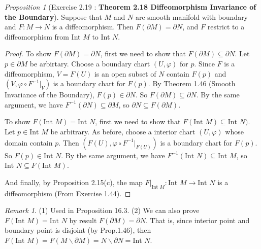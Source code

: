 \documentclass[a4paper]{article}
\theoremstyle{remark}
\newtheorem*{remark}{Remark}
\newtheorem{prop}{Proposition}
\newcommand{\doo}{\partial}    %
\newcommand{\subhim}{\subseteq} %
\newcommand{\Inter}{\text{Int }} %
\begin{document}
\begin{prop}[Exercise 2.19 \cite{LeeSM} : \textbf{Theorem 2.18 Diffeomorphism Invariance of the Boundary}]
Suppose that $M$ and $N$ are smooth manifold with boundary and $F : M \to N$ is a diffeomorphism. Then $F(\partial M) = \partial N$, and $F$ restrict to a diffeomorphism from Int $M$ to Int $N$.
\end{prop}
\begin{proof}
	To show $F(\doo M) = \doo N$, first  we need to show that $F(\doo M) \subhim \doo N$. Let $p \in \doo M$ be arbirtary. Choose a boundary chart $(U,\varphi)$ for $p$. Since $F$ is a diffeomorphism, $V=F(U)$ is an open subset of $N$ contain $F(p)$ and $(V,\varphi \circ F^{-1}|_V)$ is a boundary chart for $F(p)$. By Theorem 1.46 (Smooth Invariance of the Boundary), $F(p) \in \doo N$. So $F(\doo M) \subhim \doo N$. By the same argument, we have $F^{-1}(\doo N) \subhim \doo M$, so $\doo N \subhim F(\doo M)$.
	
	To show $F(\text{Int }M) = \text{Int }N$, first we need to show that $F(\text{Int }M) \subhim \text{Int }N)$. Let $p \in \text{Int }M$ be arbitrary. As before, choose a interior chart $(U,\varphi)$ whose domain contain $p$. Then $(F(U),\varphi \circ F^{-1}|_{F(U)})$ is a boundary chart for $F(p)$. So $F(p) \in \text{Int }N$. By the same argument, we have $F^{-1}(\text{Int }N) \subhim \text{Int }M$, so $\Inter N \subhim F(\Inter M)$.  
	
	And finally, by Proposition 2.15(c), the map $F|_{\Inter M} : \Inter M \to \Inter N$ is a diffeomorphism (From Exercise 1.44). 
\end{proof}
\begin{remark}
	(1) Used in Proposition 16.3. (2) We can also prove $F(\Inter M) = \Inter N$ by result $F(\doo M) = \doo N$. That is, since interior point and boundary point is disjoint (by Prop.1.46), then $F(\Inter M) = F(M \smallsetminus \doo M) = N \smallsetminus \doo N = \Inter N$.
\end{remark}
\end{document}
